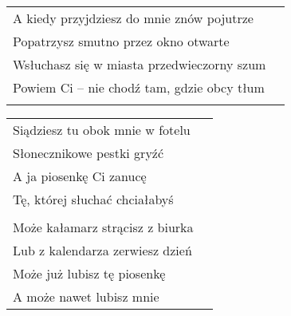 \documentclass[a5paper]{article}
\begin{document}
\noindent
\begin{tabular}{@{}p{8.50cm}p{3cm}@{}}
A kiedy przyjdziesz do mnie znów pojutrze \\
Popatrzysz smutno przez okno otwarte \\
Wsłuchasz się w miasta przedwieczorny szum \\
Powiem Ci – nie chodź tam, gdzie obcy tłum \\ \\
\end{tabular}

\noindent
\begin{tabular}{@{}p{7.50cm}p{3cm}@{}} 
Siądziesz tu obok mnie w fotelu \\
Słonecznikowe pestki gryźć \\
A ja piosenkę Ci zanucę \\
Tę, której słuchać chciałabyś \\ \\
 
Może kałamarz strącisz z biurka \\
Lub z kalendarza zerwiesz dzień \\ 
Może już lubisz tę piosenkę \\
A może nawet lubisz mnie
\end{tabular}
\end{document}
